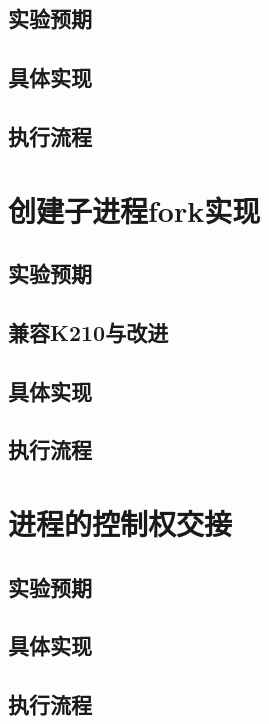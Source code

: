 \subsection{实验预期}

\subsection{具体实现}

\subsection{执行流程}

\section{创建子进程fork实现}

\subsection{实验预期}

\subsection{兼容K210与改进}

\subsection{具体实现}

\subsection{执行流程}

\section{进程的控制权交接}

\subsection{实验预期}

\subsection{具体实现}

\subsection{执行流程}

